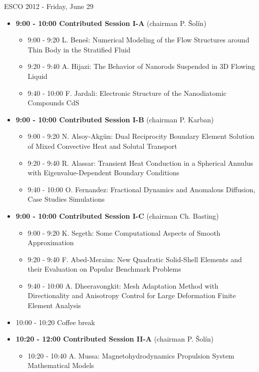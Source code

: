 \documentclass[10pt, A4]{article}%
\begin{document}
\centerline{\huge ESCO 2012 - Friday, June 29}
\vspace{4mm}
\begin{itemize}    
  \item {\bf 9:00 - 10:00 Contributed Session I-A} (chairman P. \v{S}ol\'{i}n) 
  \begin{itemize}
    \item 9:00 - 9:20 L. Bene\v{s}: Numerical Modeling of the Flow Structures around Thin Body in the Stratified Fluid 
    \item 9:20 - 9:40 A. Hijazi: The Behavior of Nanorods Suspended in 3D Flowing Liquid
    \item 9:40 - 10:00 F. Jardali: Electronic Structure of the Nanodiatomic Compounds CdS
  \end{itemize}
  \item {\bf 9:00 - 10:00 Contributed Session I-B} (chairman P. Karban) 
  \begin{itemize}
    \item 9:00 - 9:20 N. Alsoy-Akg\"{u}n: Dual Reciprocity Boundary Element Solution of Mixed Convective Heat and Solutal Transport
    \item 9:20 - 9:40 R. Alassar: Transient Heat Conduction in a Spherical Annulus with Eigenvalue-Dependent Boundary Conditions
    \item 9:40 - 10:00 O. Fernandez: Fractional Dynamics and Anomalous Diffusion, Case Studies Simulations
  \end{itemize}
  \item {\bf 9:00 - 10:00 Contributed Session I-C} (chairman Ch. Basting) 
  \begin{itemize}
    \item 9:00 - 9:20 K. Segeth: Some Computational Aspects of Smooth Approximation
    \item 9:20 - 9:40 F. Abed-Meraim: New Quadratic Solid-Shell Elements and their Evaluation on Popular Benchmark Problems
    \item 9:40 - 10:00 A. Dheeravongkit: Mesh Adaptation Method with Directionality and Anisotropy Control for Large Deformation Finite Element Analysis
  \end{itemize}
  \item 10:00 - 10:20 Coffee break
  \item {\bf 10:20 - 12:00 Contributed Session II-A} (chairman P. \v{S}ol\'{i}n) 
  \begin{itemize}
    \item 10:20 - 10:40 A. Mussa: Magnetohydrodynamics Propulsion System Mathematical Models

\end{itemize}
\end{itemize}
\end{document}
